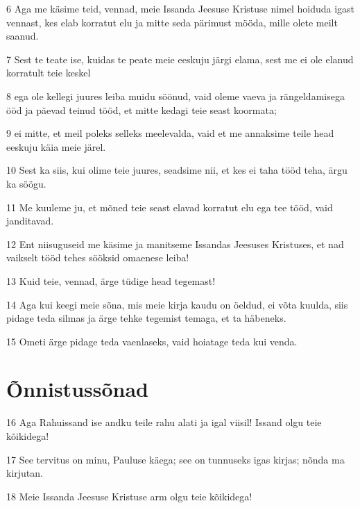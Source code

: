 \par 6 Aga me käsime teid, vennad, meie Issanda Jeesuse Kristuse nimel hoiduda igast vennast, kes elab korratut elu ja mitte seda pärimust mööda, mille olete meilt saanud.
\par 7 Sest te teate ise, kuidas te peate meie eeskuju järgi elama, sest me ei ole elanud korratult teie keskel
\par 8 ega ole kellegi juures leiba muidu söönud, vaid oleme vaeva ja rängeldamisega ööd ja päevad teinud tööd, et mitte kedagi teie seast koormata;
\par 9 ei mitte, et meil poleks selleks meelevalda, vaid et me annaksime teile head eeskuju käia meie järel.
\par 10 Sest ka siis, kui olime teie juures, seadsime nii, et kes ei taha tööd teha, ärgu ka söögu.
\par 11 Me kuuleme ju, et mõned teie seast elavad korratut elu ega tee tööd, vaid janditavad.
\par 12 Ent niisuguseid me käsime ja manitseme Issandas Jeesuses Kristuses, et nad vaikselt tööd tehes sööksid omaenese leiba!
\par 13 Kuid teie, vennad, ärge tüdige head tegemast!
\par 14 Aga kui keegi meie sõna, mis meie kirja kaudu on öeldud, ei võta kuulda, siis pidage teda silmas ja ärge tehke tegemist temaga, et ta häbeneks.
\par 15 Ometi ärge pidage teda vaenlaseks, vaid hoiatage teda kui venda.

\section*{Õnnistussõnad}

\par 16 Aga Rahuissand ise andku teile rahu alati ja igal viisil! Issand olgu teie kõikidega!
\par 17 See tervitus on minu, Pauluse käega; see on tunnuseks igas kirjas; nõnda ma kirjutan.
\par 18 Meie Issanda Jeesuse Kristuse arm olgu teie kõikidega!





